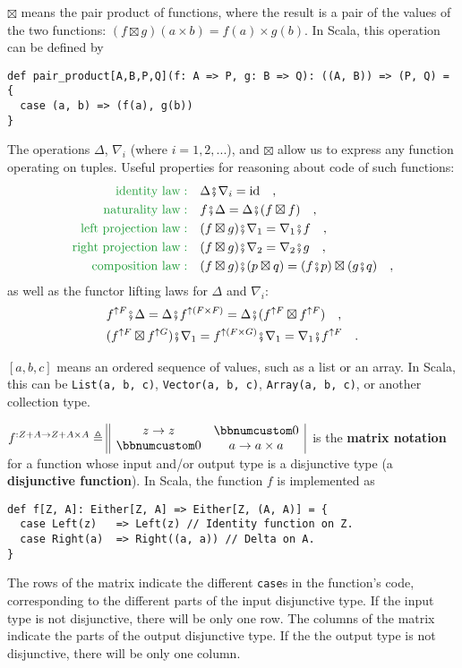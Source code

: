 $\boxtimes$ means the pair product
of functions, where the result is a pair of the values of the two
functions: $(f\boxtimes g)(a\times b)=f(a)\times g(b)$. In Scala,
this operation can be defined by
\begin{lstlisting}
def pair_product[A,B,P,Q](f: A => P, g: B => Q): ((A, B)) => (P, Q) = {
  case (a, b) => (f(a), g(b))
}
\end{lstlisting}
The operations $\Delta$, $\nabla_{i}$ (where $i=1,2,...$), and
$\boxtimes$ allow us to express any function operating on tuples.
Useful properties for reasoning about code of such functions: 
\begin{align*}
{\color{greenunder}\text{identity law}:}\quad & \Delta\bef\nabla_{i}=\text{id}\quad,\\
{\color{greenunder}\text{naturality law}:}\quad & f\bef\Delta=\Delta\bef(f\boxtimes f)\quad,\\
{\color{greenunder}\text{left projection law}:}\quad & (f\boxtimes g)\bef\nabla_{1}=\nabla_{1}\bef f\quad,\\
{\color{greenunder}\text{right projection law}:}\quad & (f\boxtimes g)\bef\nabla_{2}=\nabla_{2}\bef g\quad,\\
{\color{greenunder}\text{composition law}:}\quad & (f\boxtimes g)\bef(p\boxtimes q)=(f\bef p)\boxtimes(g\bef q)\quad,
\end{align*}
as well as the functor lifting laws for $\Delta$ and $\nabla_{i}$:
\begin{align*}
 & f^{\uparrow F}\bef\Delta=\Delta\bef f^{\uparrow(F\times F)}=\Delta\bef(f^{\uparrow F}\boxtimes f^{\uparrow F})\quad,\\
 & (f^{\uparrow F}\boxtimes f^{\uparrow G})\bef\nabla_{1}=f^{\uparrow(F\times G)}\bef\nabla_{1}=\nabla_{1}\bef f^{\uparrow F}\quad.
\end{align*}

$\left[a,b,c\right]$ means an ordered sequence of values, such as
a list or an array. In Scala, this can be \lstinline!List(a, b, c)!,
\lstinline!Vector(a, b, c)!, \lstinline!Array(a, b, c)!, or another
collection type.

$f^{:Z+A\rightarrow Z+A\times A}\triangleq\begin{array}{||cc|}
z\rightarrow z & \bbnum 0\\
\bbnum 0 & a\rightarrow a\times a
\end{array}\,$ is the \textbf{matrix notation} for a function
whose input and/or output type is a disjunctive type (a
\textbf{disjunctive function}). In Scala, the function $f$ is implemented
as
\begin{lstlisting}
def f[Z, A]: Either[Z, A] => Either[Z, (A, A)] = {
  case Left(z)   => Left(z) // Identity function on Z.
  case Right(a)  => Right((a, a)) // Delta on A.
}
\end{lstlisting}
The rows of the matrix indicate the different \lstinline!case!s in
the function's code, corresponding to the different parts of the input
disjunctive type. If the input type is not disjunctive, there will
be only one row. The columns of the matrix indicate the parts of the
output disjunctive type. If the the output type is not disjunctive,
there will be only one column.


